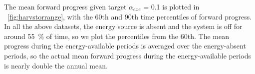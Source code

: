  The mean forward progress given target $\alpha_{exe}$ = 0.1 is plotted in \figurename{~\ref{fig:harvstorrange}}, with the 60th and 90th time percentiles of forward progress. In all the  above datasets, the energy source is absent and the system is off for around \SI{55}{\percent} of time, so we plot the percentiles from the 60th. The mean progress during the energy-available periods is averaged over the energy-absent periods, so the actual mean forward progress during the energy-available periods is nearly double the annual mean. 


